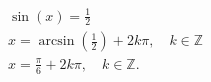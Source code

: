 \documentclass[preview,convert={density=300,outext=.png}]{standalone}
\begin{document}
\begin{align*}
    & \sin(x) = \frac{1}{2} \\
    & x = \arcsin\left(\frac{1}{2}\right) + 2k\pi, \quad k \in \mathbb{Z} \\
    & x = \frac{\pi}{6} + 2k\pi, \quad k \in \mathbb{Z}.
\end{align*}
\end{document}
